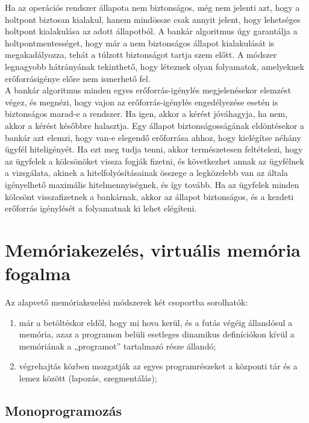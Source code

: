 \documentclass[tikz,12pt,margin=0px]{article}
\begin{document}
    \noindent Ha az operációs rendszer állapota nem biztonságos, még nem jelenti azt, hogy a holtpont biztosan kialakul, hanem mindössze csak annyit jelent, hogy lehetséges holtpont kialakulása az adott állapotból. A bankár algoritmus úgy garantálja a holtpontmentességet, hogy már a nem biztonságos állapot kialakulását is megakadályozza, tehát a túlzott biztonságot tartja szem előtt. A módszer legnagyobb hátrányának tekinthető, hogy léteznek olyan folyamatok, amelyeknek erőforrásigénye előre nem ismerhető fel.\\

    \noindent A bankár algoritmus minden egyes erőforrás-igénylés megjelenésekor elemzést végez, és megnézi, hogy vajon az erőforrás-igénylés engedélyezése esetén is biztonságos marad-e a rendszer. Ha igen, akkor a kérést jóváhagyja, ha nem, akkor a kérést későbbre halasztja. Egy állapot biztonságosságának eldöntésekor a bankár azt elemzi, hogy van-e elegendő erőforrása ahhoz, hogy kielégítse néhány ügyfél hiteligényét. Ha ezt meg tudja tenni, akkor természetesen feltételezi, hogy az ügyfelek a kölcsönöket vissza fogják fizetni, és következhet annak az ügyfélnek a vizsgálata, akinek a hitelfolyósításainak összege a legközelebb van az általa igényelhető maximális hitelmennyiségnek, és így tovább. Ha az ügyfelek minden kölcsönt visszafizetnek a bankárnak, akkor az állapot biztonságos, és a kezdeti erőforrás igénylését a folyamatnak ki lehet elégíteni.
	
	\section*{Memóriakezelés, virtuális memória fogalma}
	
    Az alapvető memóriakezelési módszerek két csoportba sorolhatók:

    \begin{enumerate}[topsep=8pt,itemsep=4pt,partopsep=4pt, parsep=4pt]
        \item már a betöltéskor eldől, hogy mi hova kerül, és a futás végéig állandósul a memória, azaz a programon belüli esetleges dinamikus definíciókon kívül a memóriának a „programot” tartalmazó része állandó;
        \item végrehajtás közben mozgatják az egyes programrészeket a központi tár és a lemez között (lapozás, szegmentálás);
    \end{enumerate}

	\subsection*{Monoprogramozás}
\end{document}
